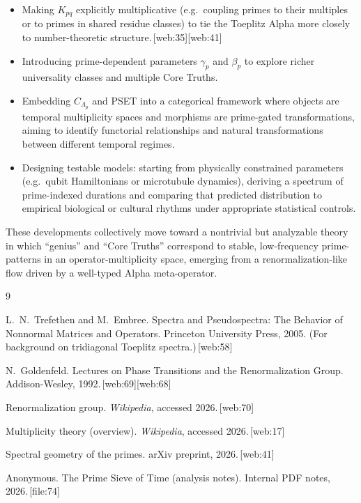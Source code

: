\documentclass[11pt]{article}
\begin{document}
\begin{itemize}
  \item Making \(K_{pq}\) explicitly multiplicative (e.g.\ coupling primes to their multiples or to primes in shared residue classes) to tie the Toeplitz Alpha more closely to number-theoretic structure.\,[web:35][web:41]
  \item Introducing prime-dependent parameters \(\gamma_p\) and \(\beta_p\) to explore richer universality classes and multiple Core Truths.
  \item Embedding \(C_{\Lambda_p}\) and PSET into a categorical framework where objects are temporal multiplicity spaces and morphisms are prime-gated transformations, aiming to identify functorial relationships and natural transformations between different temporal regimes.
  \item Designing testable models: starting from physically constrained parameters (e.g.\ qubit Hamiltonians or microtubule dynamics), deriving a spectrum of prime-indexed durations and comparing that predicted distribution to empirical biological or cultural rhythms under appropriate statistical controls.
\end{itemize}

These developments collectively move toward a nontrivial but analyzable theory in which ``genius'' and ``Core Truths'' correspond to stable, low-frequency prime-patterns in an operator-multiplicity space, emerging from a renormalization-like flow driven by a well-typed Alpha meta-operator.


\begin{thebibliography}{9}

L.~N.~Trefethen and M.~Embree.
\newblock Spectra and Pseudospectra: The Behavior of Nonnormal Matrices and Operators.
\newblock Princeton University Press, 2005. (For background on tridiagonal Toeplitz spectra.)\,[web:58]

N.~Goldenfeld.
\newblock Lectures on Phase Transitions and the Renormalization Group.
\newblock Addison-Wesley, 1992.\,[web:69][web:68]

Renormalization group.
\newblock \emph{Wikipedia}, accessed 2026.\,[web:70]

Multiplicity theory (overview).
\newblock \emph{Wikipedia}, accessed 2026.\,[web:17]

Spectral geometry of the primes.
\newblock arXiv preprint, 2026.\,[web:41]

Anonymous.
\newblock The Prime Sieve of Time (analysis notes).
\newblock Internal PDF notes, 2026.\,[file:74]

\end{thebibliography}


\nocite{*}


\clearpage
\end{document}
